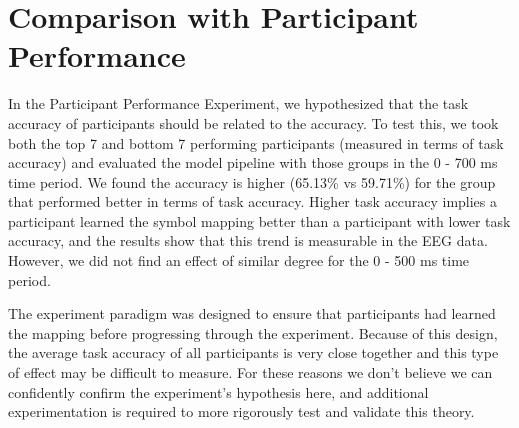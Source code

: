 \section{Comparison with Participant Performance}
In the Participant Performance Experiment, we hypothesized that the task 
accuracy of participants should be related to the \tvt accuracy. To test this, 
we took both the top 7 and bottom 7 performing participants (measured in terms 
of task accuracy) and evaluated the model pipeline with those groups in the 0 - 
700 ms time period.  We found the \tvt accuracy is higher (65.13\% vs 59.71\%) 
for the group that performed better in terms of task accuracy. Higher task 
accuracy implies a participant learned the symbol mapping better than a 
participant with lower task accuracy, and the \tvt results show that this trend 
is measurable in the EEG data.  However, we did not find an effect of similar 
degree for the 0 - 500 ms time period.

The experiment paradigm was designed to ensure that participants had learned 
the mapping before progressing through the experiment. Because of this design, 
the average task accuracy of all participants is very close together and this 
type of effect may be difficult to measure. For these reasons we don't believe 
we can confidently confirm the experiment's hypothesis here, and additional 
experimentation is required to more rigorously test and validate this theory.
